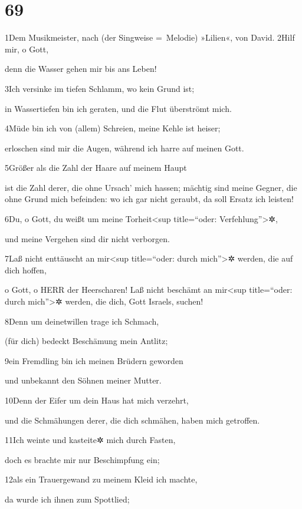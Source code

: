 \hypertarget{section-68}{%
\section{69}\label{section-68}}

1Dem Musikmeister, nach (der Singweise =~Melodie) »Lilien«, von David.
2Hilf mir, o Gott,

denn die Wasser gehen mir bis ans Leben!

3Ich versinke im tiefen Schlamm, wo kein Grund ist;

in Wassertiefen bin ich geraten, und die Flut überströmt mich.

4Müde bin ich von (allem) Schreien, meine Kehle ist heiser;

erloschen sind mir die Augen, während ich harre auf meinen Gott.

5Größer als die Zahl der Haare auf meinem Haupt

ist die Zahl derer, die ohne Ursach' mich hassen; mächtig sind meine
Gegner, die ohne Grund mich befeinden: wo ich gar nicht geraubt, da soll
Ersatz ich leisten!

6Du, o Gott, du weißt um meine Torheit\textless sup title=``oder:
Verfehlung''\textgreater✲,

und meine Vergehen sind dir nicht verborgen.

7Laß nicht enttäuscht an mir\textless sup title=``oder: durch
mich''\textgreater✲ werden, die auf dich hoffen,

o Gott, o HERR der Heerscharen! Laß nicht beschämt an mir\textless sup
title=``oder: durch mich''\textgreater✲ werden, die dich, Gott Israels,
suchen!

8Denn um deinetwillen trage ich Schmach,

(für dich) bedeckt Beschämung mein Antlitz;

9ein Fremdling bin ich meinen Brüdern geworden

und unbekannt den Söhnen meiner Mutter.

10Denn der Eifer um dein Haus hat mich verzehrt,

und die Schmähungen derer, die dich schmähen, haben mich getroffen.

11Ich weinte und kasteite✲ mich durch Fasten,

doch es brachte mir nur Beschimpfung ein;

12als ein Trauergewand zu meinem Kleid ich machte,

da wurde ich ihnen zum Spottlied;

